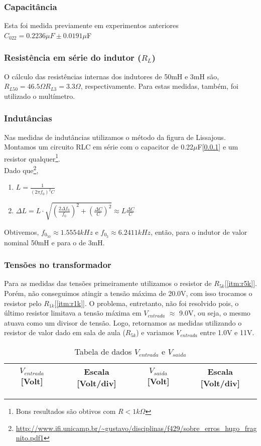 \documentclass[12pt,letterpaper]{article}
\begin{document}
\subsubsection{Capacitância} \label{itm:ccap} Esta foi medida previamente em experimentos anteriores $C_{022} = 0.2236\mu F \pm 0.0191\mu$F
\subsubsection{Resistência em série do indutor ($R_L$)} \label{itm:rindutor}  O cálculo das resistências internas dos indutores de 50mH e 3mH são, $R_{L50} = 46.5\Omega R_{L3} = 3.3\Omega$, respectivamente. Para estas medidas, também, foi utilizado o multímetro.
\subsubsection{Indutâncias} \label{itm:iindutor} Nas medidas de indutâncias utilizamos o método da figura de Lissajous. Montamos um circuito RLC em série com o capacitor de 0.22$\mu$F[\ref{itm:ccap}] e um resistor qualquer\footnote{Bons resultados são obtivos com $R < 1k\Omega$}.\\
Dado que\footnote{\url{http://www.ifi.unicamp.br/~gustavo/disciplinas/f429/sobre_erros_hugo_fragnito.pdf1}},
\begin{enumerate}[I]
\item $L = \frac{1}{(2\pi f_0)^2 C}$ 
\item $\Delta{L} = L \cdot \sqrt{(\frac{2\Delta f_0}{f_0})^2 + (\frac{\Delta C}{C})^2} \approx L \frac{\Delta C}{C}$
\end{enumerate}
Obtivemos, $f_{0_{50}} \approx 1.5554kHz$ e $f_{0_3} \approx 6.2411kHz$, então,  para o indutor de valor nominal 50mH e  para o de 3mH.
\subsubsection{Tensões no transformador} \label{itm:ttrans} Para as medidas das tensões primeiramente utilizamos o resistor de $R_{5k}$[\ref{itm:r5k}]. Porém, não conseguimos atingir a tensão máxima de 20.0V, com isso trocamos o resistor pelo $R_{1k}$[\ref{itm:r1k}]. O problema, entretanto, não foi resolvido pois, o último resistor limitava a tensão máxima em $V_{entrada}$ $\approx$ 9.0V, ou seja, o mesmo atuava como um divisor de tensão. Logo, retornamos as medidas utilizando o resistor de valor dado em sala de aula ($R_{5k}$) e variamos $V_{entrada}$ entre 1.0V e 11V.
\begin{table}
  \tiny
  \centering
  \begin{tabular}{|c|c|c|c|}
    \hline
    $V_{entrada}$ [Volt] & Escala [Volt/div] & $V_{saida}$ [Volt] & Escala [Volt/div]\\
    \hline
        
    \hline
  \end{tabular}
  \caption{Tabela de dados $V_{entrada}$ e $V_{saida}$}
\end{table}
\end{document}
